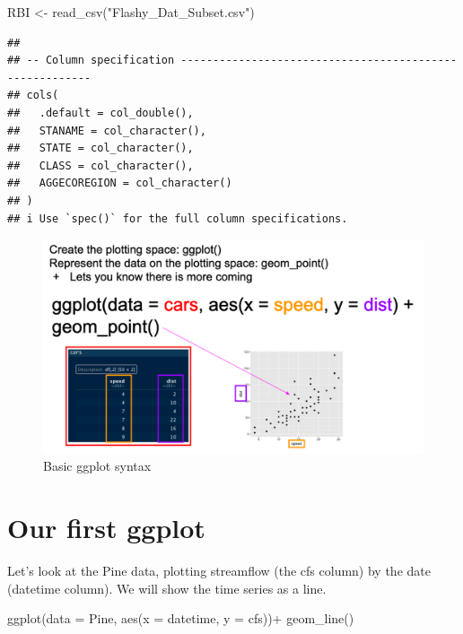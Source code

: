\documentclass[
]{book}
\newenvironment{Shaded}{\begin{snugshade}}{\end{snugshade}}
\newcommand{\AttributeTok}[1]{\textcolor[rgb]{0.77,0.63,0.00}{#1}}
\newcommand{\FunctionTok}[1]{\textcolor[rgb]{0.00,0.00,0.00}{#1}}
\newcommand{\NormalTok}[1]{#1}
\newcommand{\OtherTok}[1]{\textcolor[rgb]{0.56,0.35,0.01}{#1}}
\newcommand{\SpecialCharTok}[1]{\textcolor[rgb]{0.00,0.00,0.00}{#1}}
\newcommand{\StringTok}[1]{\textcolor[rgb]{0.31,0.60,0.02}{#1}}
\begin{document}
\begin{Shaded}
\begin{Highlighting}[]
\NormalTok{RBI }\OtherTok{\textless{}{-}} \FunctionTok{read\_csv}\NormalTok{(}\StringTok{"Flashy\_Dat\_Subset.csv"}\NormalTok{)}
\end{Highlighting}
\end{Shaded}

\begin{verbatim}
## 
## -- Column specification --------------------------------------------------------
## cols(
##   .default = col_double(),
##   STANAME = col_character(),
##   STATE = col_character(),
##   CLASS = col_character(),
##   AGGECOREGION = col_character()
## )
## i Use `spec()` for the full column specifications.
\end{verbatim}

\begin{figure}
\centering
\includegraphics{images/GGplot syntax.png}
\caption{Basic ggplot syntax}
\end{figure}

\hypertarget{our-first-ggplot}{%
\section{Our first ggplot}\label{our-first-ggplot}}

Let's look at the Pine data, plotting streamflow (the cfs column) by the date (datetime column). We will show the time series as a line.

\begin{Shaded}
\begin{Highlighting}[]
\FunctionTok{ggplot}\NormalTok{(}\AttributeTok{data =}\NormalTok{ Pine, }\FunctionTok{aes}\NormalTok{(}\AttributeTok{x =}\NormalTok{ datetime, }\AttributeTok{y =}\NormalTok{ cfs))}\SpecialCharTok{+}
  \FunctionTok{geom\_line}\NormalTok{()}
\end{Highlighting}
\end{Shaded}
\end{document}
